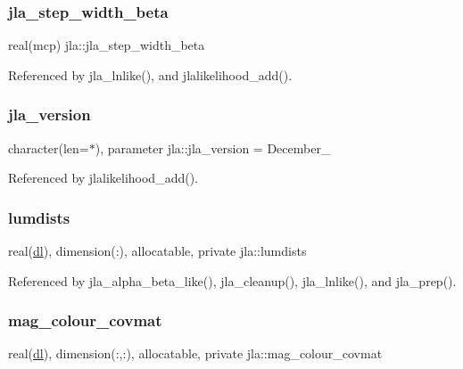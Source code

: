 \subsubsection{\texorpdfstring{jla\+\_\+step\+\_\+width\+\_\+beta}{jla\_step\_width\_beta}}
{\footnotesize\ttfamily real(mcp) jla\+::jla\+\_\+step\+\_\+width\+\_\+beta}



Referenced by jla\+\_\+lnlike(), and jlalikelihood\+\_\+add().

\mbox{\label{namespacejla_a9facfef6576a64d9e5b180caec42ea7d}} 
\subsubsection{\texorpdfstring{jla\+\_\+version}{jla\_version}}
{\footnotesize\ttfamily character(len=$\ast$), parameter jla\+::jla\+\_\+version = \textquotesingle{}December\+\_\textquotesingle{}}



Referenced by jlalikelihood\+\_\+add().

\mbox{\label{namespacejla_a488389e4c0ef651c499c3c48d6bee7ef}} 
\subsubsection{\texorpdfstring{lumdists}{lumdists}}
{\footnotesize\ttfamily real(\mbox{\hyperlink{namespacejla_a3aa6435b4e08f1d532390186ac608741}{dl}}), dimension(\+:), allocatable, private jla\+::lumdists\hspace{0.3cm}{\ttfamily [private]}}



Referenced by jla\+\_\+alpha\+\_\+beta\+\_\+like(), jla\+\_\+cleanup(), jla\+\_\+lnlike(), and jla\+\_\+prep().

\mbox{\label{namespacejla_a0eab7a6fccee7c07f28748c3bcb2c260}} 
\subsubsection{\texorpdfstring{mag\+\_\+colour\+\_\+covmat}{mag\_colour\_covmat}}
{\footnotesize\ttfamily real(\mbox{\hyperlink{namespacejla_a3aa6435b4e08f1d532390186ac608741}{dl}}), dimension(\+:,\+:), allocatable, private jla\+::mag\+\_\+colour\+\_\+covmat\hspace{0.3cm}{\ttfamily [private]}}



